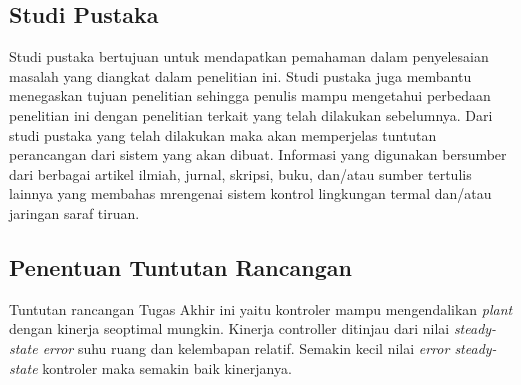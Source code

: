 

\subsection{Studi Pustaka}
Studi pustaka bertujuan untuk mendapatkan pemahaman dalam penyelesaian masalah yang diangkat dalam penelitian ini. Studi pustaka juga membantu menegaskan tujuan penelitian sehingga penulis mampu mengetahui perbedaan penelitian ini dengan penelitian terkait yang telah dilakukan sebelumnya. Dari studi pustaka yang telah dilakukan maka akan memperjelas tuntutan perancangan dari sistem yang akan dibuat. Informasi yang digunakan bersumber dari berbagai artikel ilmiah, jurnal, skripsi, buku, dan/atau sumber tertulis lainnya yang membahas mrengenai sistem kontrol lingkungan termal dan/atau jaringan saraf tiruan.

\subsection{Penentuan Tuntutan Rancangan}

Tuntutan rancangan Tugas Akhir ini yaitu kontroler mampu mengendalikan \textit{plant} dengan kinerja seoptimal mungkin. Kinerja controller ditinjau dari nilai \textit{steady-state error} suhu ruang dan kelembapan relatif. Semakin kecil nilai \textit{error steady-state} kontroler maka semakin baik kinerjanya.

